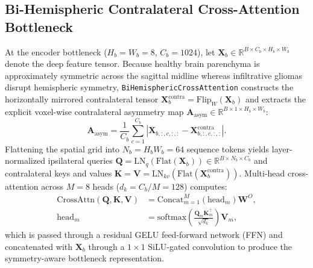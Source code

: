 \documentclass[journal,onecolumn,10pt]{IEEEtran}
\begin{document}
\subsection{Bi-Hemispheric Contralateral Cross-Attention Bottleneck}
At the encoder bottleneck ($H_b = W_b = 8$, $C_b = 1024$), let $\mathbf{X}_b \in \mathbb{R}^{B \times C_b \times H_b \times W_b}$ denote the deep feature tensor. Because healthy brain parenchyma is approximately symmetric across the sagittal midline whereas infiltrative gliomas disrupt hemispheric symmetry, \texttt{BiHemisphericCrossAttention} constructs the horizontally mirrored contralateral tensor $\mathbf{X}_b^{\text{contra}} = \text{Flip}_W(\mathbf{X}_b)$ and extracts the explicit voxel-wise contralateral asymmetry map $\mathbf{A}_{\text{asym}} \in \mathbb{R}^{B \times 1 \times H_b \times W_b}$:
\begin{equation}
    \mathbf{A}_{\text{asym}} = \frac{1}{C_b}\sum_{c=1}^{C_b} \left|\mathbf{X}_{b,:,c,:,:} - \mathbf{X}_{b,:,c,:,:}^{\text{contra}}\right|.
    \label{eq:asym_map}
\end{equation}
Flattening the spatial grid into $N_b = H_b W_b = 64$ sequence tokens yields layer-normalized ipsilateral queries $\mathbf{Q} = \text{LN}_q(\text{Flat}(\mathbf{X}_b)) \in \mathbb{R}^{B \times N_b \times C_b}$ and contralateral keys and values $\mathbf{K} = \mathbf{V} = \text{LN}_{kv}(\text{Flat}(\mathbf{X}_b^{\text{contra}}))$. Multi-head cross-attention across $M = 8$ heads ($d_k = C_b / M = 128$) computes:
\begin{equation}
\begin{aligned}
    \text{CrossAttn}(\mathbf{Q},\mathbf{K},\mathbf{V}) &= \text{Concat}_{m=1}^{M}\!\left(\text{head}_m\right)\mathbf{W}^O, \\
    \text{head}_m &= \text{softmax}\!\left(\frac{\mathbf{Q}_m \mathbf{K}_m^\top}{\sqrt{d_k}}\right)\mathbf{V}_m,
\end{aligned}
    \label{eq:cross_attn}
\end{equation}
which is passed through a residual GELU feed-forward network (FFN) and concatenated with $\mathbf{X}_b$ through a $1\times 1$ SiLU-gated convolution to produce the symmetry-aware bottleneck representation.
\end{document}
